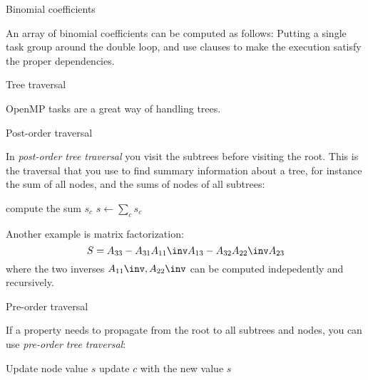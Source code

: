  {Binomial coefficients}

\begin{exercise}
  An array of binomial coefficients can be computed as follows:
  Putting a single task group around the double loop, and use
   clauses to make the execution satisfy the proper dependencies.
\end{exercise}

 {Tree traversal}

OpenMP tasks are a great way of handling trees.

 {Post-order traversal}

In \emph{post-order tree traversal}
you visit the subtrees before visiting the root. This is the traversal
that you use to find summary information about a tree, for instance
the sum of all nodes, and the sums of nodes of all subtrees:

\begin{displayalgorithm}
      {compute the sum $s_c$}\;
      $ s \leftarrow \sum_c s_c$
\end{displayalgorithm}

Another example is matrix factorization:
\[ S = A_{33} - A_{31}A_{11}\inv A_{13} - A_{32}A_{22}\inv A_{23} \]
where the two inverses $A_{11}\inv,A_{22}\inv$ can be computed
indepedently and recursively.

 {Pre-order traversal}

If a property needs to propagate from the root to all subtrees and
nodes, you can use \emph{pre-order tree
  traversal}:

\begin{displayalgorithm}
  Update node value $s$\;
      {update $c$ with the new value $s$}\;
\end{displayalgorithm}

\begin{comment}
  https://en.wikipedia.org/wiki/Huffman_coding
\end{comment}

